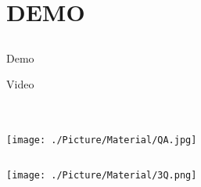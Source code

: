\documentclass[xcolor=table,compress,blue]{beamer}
\begin{document}
\section{DEMO}
\subsection{}
\begin{frame}{Demo}
	\begin{exampleblock}{Video}
	\end{exampleblock}
\end{frame}



\section{}
\begin{frame}[plain]
	\thispagestyle{empty}
	\begin{columns}
		\begin{column}{\paperwidth}
			\texttt{[image: ./Picture/Material/QA.jpg]}
		\end{column}
	\end{columns}
\end{frame}

\begin{frame}[plain]
	\thispagestyle{empty}
	\begin{columns}
		\begin{column}{\paperwidth}
			\texttt{[image: ./Picture/Material/3Q.png]}
		\end{column}
	\end{columns}
\end{frame}
\end{document}

